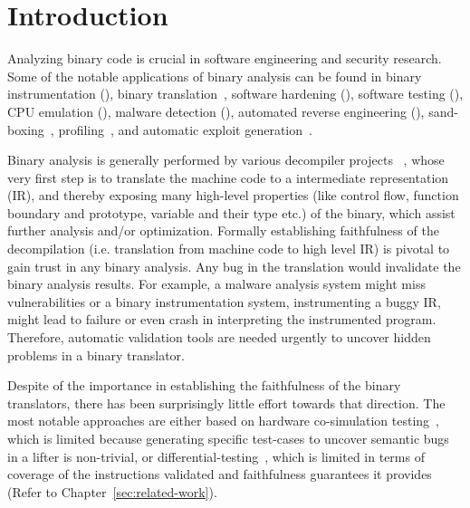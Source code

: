 \chapter{Introduction}\label{sec:ba}

Analyzing binary code is crucial in software engineering and security research.
Some of the notable applications of binary analysis can be found in binary
instrumentation
(\cite{Bruening:CGO2003,PEBIL10,Pin:2005,Valgrind:ENTCS03,DynamoRIO:2004}),
  binary translation~\cite{UQBT:2000}, software hardening
  (\cite{Cha:2015,Ford:2008,Zhang,Zhang:2013}), software testing
  (\cite{Chipounov:2011,Avgerinos:2014,godefroid_automated_2008}), CPU
  emulation (\cite{QEMU:USENIX05,Magnusson:2002}), malware detection
  (\cite{Christodorescu:2005,Kruegel:2004,BitBlaze:2008,BAP:CAV11,Egele:USENIX07,Yin:CCS07}),
  automated reverse engineering
  (\cite{Cui:2008,Lin:2008,Schwartz:2013,Yakdan2015NDSS,McSema:Recon14,Angr,Radare2}),
  sand-boxing~\cite{Kiriansky:2002:SEV,Erlingsson:2006,Yee:2009},
  profiling~\cite{Harris:2005,Srivastava:1994}, and automatic exploit
  generation~\cite{Cha:2012}.
               
                 Binary analysis is generally performed by various decompiler
                 projects
                 ~\cite{McSema:Recon14,Remill,Angr1,BAP:CAV11,Radare2}, whose
                 very first step is to translate the machine code to a
                 intermediate representation (IR), and thereby exposing many
                 high-level properties (like control flow, function boundary
                     and prototype, variable and their type etc.) of the
                 binary, which  assist further analysis and/or optimization.
                 Formally establishing faithfulness of the decompilation (i.e.
                     translation from machine code to high level IR) is pivotal
                 to gain trust in any binary analysis. Any bug in the
                 translation would invalidate the binary analysis results.  For
                 example, a malware analysis system might miss vulnerabilities
                 or a binary instrumentation system, instrumenting a buggy IR,
                 might lead to failure or even crash in interpreting the
                 instrumented program. Therefore, automatic validation tools
                 are needed urgently to uncover hidden problems in a binary
                 translator. 

Despite of the importance in establishing the faithfulness of the binary
translators, there has been surprisingly little effort towards that direction.
The most notable approaches are either based on hardware co-simulation
testing~\cite{Martignoni:ISSTA2009,Martignoni:ISSTA2010}, which is limited
because generating specific test-cases to uncover semantic bugs in a lifter is
non-trivial, or differential-testing~\cite{Martignoni:ASPLOS2012,ASE2017},
  which is limited in terms of coverage of the instructions validated and
  faithfulness guarantees it provides (Refer to
      Chapter~\ref{sec:related-work}). 

